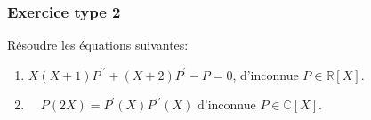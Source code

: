 \documentclass[titlepage, twoside]{report}
\begin{document}
\subsubsection{Exercice type 2}
\begin{tcolorbox}[title=Exercice 3, title filled=false, colframe=darkgreen, colback=darkgreen!10!white]
    Résoudre les équations suivantes:
    \begin{enumerate}
        \item $X(X+1) P^{\prime \prime}+(X+2) P^{\prime}-P=0$, d'inconnue $P \in \mathbb{R}[X]$.
        \item $\quad P(2 X)=P^{\prime}(X) P^{\prime \prime}(X)$ d'inconnue $P \in \mathbb{C}[X]$.
    \end{enumerate}
\end{tcolorbox}
\end{document}

